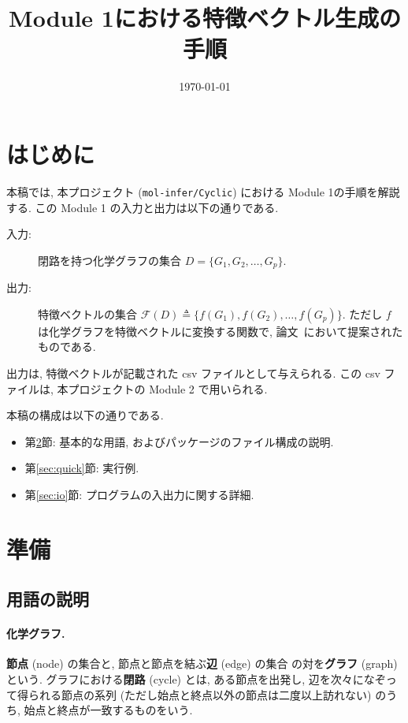 \documentclass[11pt, titlepage, dvipdfmx, twoside]{jarticle}
\title{\huge Module 1における特徴ベクトル生成の手順}
\author{\project}
\newcommand{\project}{{\tt mol-infer/Cyclic}}
\newcommand{\secref}[1]{第\ref{sec:#1}節}
\begin{document}
\makeatletter 
\let\c@lstlisting\c@figure
\makeatother
{}
\date{\today}
\maketitle
\thispagestyle{empty}
\tableofcontents
\clearpage
{}


\section{はじめに}
本稿では, 本プロジェクト (\project) における Module 1の手順を解説する. 
この Module 1 の入力と出力は以下の通りである. 

\begin{oframed}
\begin{description}
\item[入力:] 閉路を持つ化学グラフの集合 $D=\{G_1,G_2,\dots,G_p\}$. 
\item[出力:] 特徴ベクトルの集合 ${\mathcal F}(D)\triangleq\{f(G_1),f(G_2),\dots,f(G_p)\}$.
  ただし $f$ は化学グラフを特徴ベクトルに変換する関数で,
  論文~\cite{BH_cyclic_arxiv}において提案されたものである. 
\end{description}
\end{oframed}
出力は, 特徴ベクトルが記載された csv ファイルとして与えられる.
この csv ファイルは, 本プロジェクトの Module 2 で用いられる. 

本稿の構成は以下の通りである. 
\begin{itemize}
\item \secref{preparation}: 基本的な用語, およびパッケージのファイル構成の説明. 
\item \secref{quick}: 実行例. 
\item \secref{io}: プログラムの入出力に関する詳細. 
\end{itemize}

\clearpage
\section{準備}
\label{sec:preparation}

\subsection{用語の説明}
\paragraph{化学グラフ.}
{\bf 節点} (node) の集合と, 節点と節点を結ぶ{\bf 辺} (edge) の集合
の対を{\bf グラフ} (graph) という.
グラフにおける{\bf 閉路} (cycle) とは,
ある節点を出発し, 辺を次々になぞって得られる節点の系列
(ただし始点と終点以外の節点は二度以上訪れない) のうち, 始点と終点が一致するものをいう.
\end{document}
